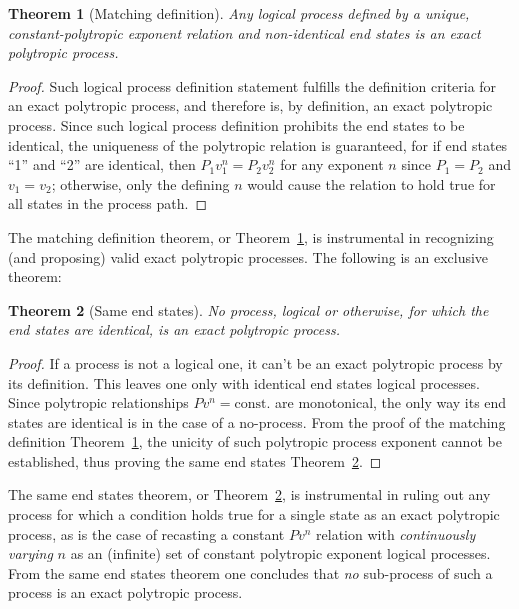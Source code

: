 \documentclass[fleqn,10pt]{SelfArx}
\newtheorem{theorem}{Theorem}
\begin{document}
    \begin{theorem}[Matching definition]\label{theo:matching.def}
        Any logical process defined by  a  unique,  constant-polytropic  exponent  relation  and
        non-identical end states is an exact polytropic process.
    \end{theorem}

    \begin{proof}
        Such logical process definition statement fulfills the definition criteria for an  exact
        polytropic process, and therefore is, by definition, an exact polytropic process.  Since
        such logical process definition prohibits the end states to be identical, the uniqueness
        of the polytropic relation is  guaranteed,  for  if  end  states  ``1''  and  ``2''  are
        identical, then $P_1v_1^n = P_2v_2^n$ for any exponent $n$ since $P_1 = P_2$ and $v_1  =
        v_2$; otherwise, only the defining $n$ would cause the relation to  hold  true  for  all
        states in the process path.
    \end{proof}

    The matching definition theorem, or Theorem~\ref{theo:matching.def}, is instrumental in
    recognizing (and proposing) valid exact polytropic processes. The following is an exclusive
    theorem:

    \begin{theorem}[Same end states]\label{theo:same.end.states}
        No process, logical or otherwise, for which the end states are identical, is an exact
        polytropic process.
    \end{theorem}

    \begin{proof}
        If a process is not a logical one, it can't  be  an  exact  polytropic  process  by  its
        definition. This leaves one only with identical  end  states  logical  processes.  Since
        polytropic relationships $Pv^n = \mbox{const.}$ are monotonical, the only  way  its  end
        states are identical is in the case of a no-process. From  the  proof  of  the  matching
        definition Theorem~\ref{theo:matching.def},  the  unicity  of  such  polytropic  process
        exponent   cannot   be   established,    thus    proving    the    same    end    states
        Theorem~\ref{theo:same.end.states}.
    \end{proof}

    The same end states  theorem,  or  Theorem~\ref{theo:same.end.states},  is  instrumental  in
    ruling out any process for which a condition holds true for  a  single  state  as  an  exact
    polytropic  process,  as  is  the  case  of  recasting  a  constant  $Pv^n$  relation   with
    \emph{continuously varying} $n$ as an (infinite) set of constant polytropic exponent logical
    processes. From the same end states theorem one concludes that \emph{no} sub-process of such
    a process is an exact polytropic process.
\end{document}

